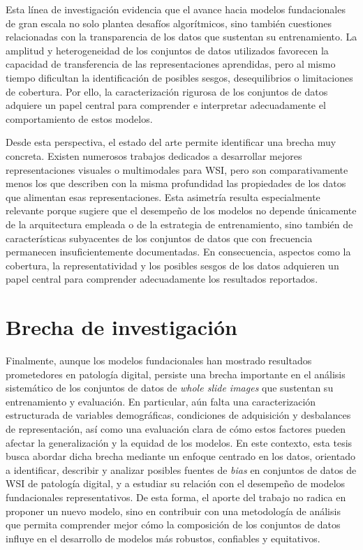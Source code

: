 Esta línea de investigación evidencia que el avance hacia modelos fundacionales de gran escala no solo plantea desafíos algorítmicos, sino también cuestiones relacionadas con la transparencia de los datos que sustentan su entrenamiento. La amplitud y heterogeneidad de los conjuntos de datos utilizados favorecen la capacidad de transferencia de las representaciones aprendidas, pero al mismo tiempo dificultan la identificación de posibles sesgos, desequilibrios o limitaciones de cobertura. Por ello, la caracterización rigurosa de los conjuntos de datos adquiere un papel central para comprender e interpretar adecuadamente el comportamiento de estos modelos.

Desde esta perspectiva, el estado del arte permite identificar una brecha muy concreta. Existen numerosos trabajos dedicados a desarrollar mejores representaciones visuales o multimodales para WSI, pero son comparativamente menos los que describen con la misma profundidad las propiedades de los datos que alimentan esas representaciones. Esta asimetría resulta especialmente relevante porque sugiere que el desempeño de los modelos no depende únicamente de la arquitectura empleada o de la estrategia de entrenamiento, sino también de características subyacentes de los conjuntos de datos que con frecuencia permanecen insuficientemente documentadas. En consecuencia, aspectos como la cobertura, la representatividad y los posibles sesgos de los datos adquieren un papel central para comprender adecuadamente los resultados reportados.

\section{Brecha de investigación}

Finalmente, aunque los modelos fundacionales han mostrado resultados prometedores en patología digital, persiste una brecha importante en el análisis sistemático de los conjuntos de datos de \textit{whole slide images} que sustentan su entrenamiento y evaluación. En particular, aún falta una caracterización estructurada de variables demográficas, condiciones de adquisición y desbalances de representación, así como una evaluación clara de cómo estos factores pueden afectar la generalización y la equidad de los modelos. En este contexto, esta tesis busca abordar dicha brecha mediante un enfoque centrado en los datos, orientado a identificar, describir y analizar posibles fuentes de \textit{bias} en conjuntos de datos de WSI de patología digital, y a estudiar su relación con el desempeño de modelos fundacionales representativos. De esta forma, el aporte del trabajo no radica en proponer un nuevo modelo, sino en contribuir con una metodología de análisis que permita comprender mejor cómo la composición de los conjuntos de datos influye en el desarrollo de modelos más robustos, confiables y equitativos.
